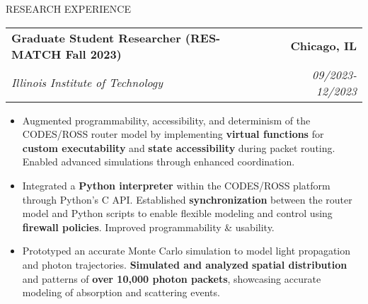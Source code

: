 \documentclass{resume} %
\begin{document}
\vspace{-5pt} %
\begin{rSection}{RESEARCH EXPERIENCE}

   \begin{tabularx}{\textwidth}{@{}X r}
      \textbf{Graduate Student Researcher (RES-MATCH Fall 2023)} & \textbf{Chicago, IL} \\
      \textit{Illinois Institute of Technology} & \textit{09/2023-12/2023} \\
   \end{tabularx}


   \begin{minipage}[t]{1\textwidth}
      \begin{itemize}[left=0pt, nosep, before=\vspace{-0.5\baselineskip}]


\item \small Augmented programmability, accessibility, and determinism of the CODES/ROSS router model by implementing \textbf{virtual functions} for \textbf{custom executability} and \textbf{state accessibility} during packet routing. Enabled advanced simulations through enhanced coordination.

\item \small Integrated a \textbf{Python interpreter} within the CODES/ROSS platform through Python's C API. Established \textbf{synchronization} between the router model and Python scripts to enable flexible modeling and control using \textbf{firewall policies}. Improved programmability \& usability.

\item \small Prototyped an accurate Monte Carlo simulation to model light propagation and photon trajectories. \textbf{Simulated and analyzed} \textbf{spatial distribution} and patterns of \textbf{over 10,000 photon packets}, showcasing accurate modeling of absorption and scattering events.

      \end{itemize}
   \end{minipage}


\end{rSection}
\end{document}
